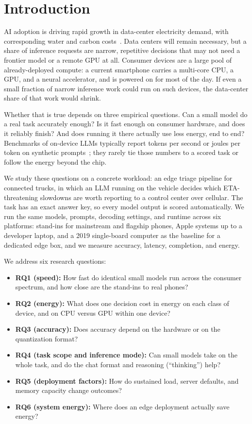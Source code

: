 \documentclass[conference]{IEEEtran}
\begin{document}
\section{Introduction}

AI adoption is driving rapid growth in data-center electricity demand, with corresponding water and carbon costs~\cite{iea2025energyai,luccioni2024power}. Data centers will remain necessary, but a share of inference requests are narrow, repetitive decisions that may not need a frontier model or a remote GPU at all. Consumer devices are a large pool of already-deployed compute: a current smartphone carries a multi-core CPU, a GPU, and a neural accelerator, and is powered on for most of the day. If even a small fraction of narrow inference work could run on such devices, the data-center share of that work would shrink.

Whether that is true depends on three empirical questions. Can a small model do a real task accurately enough? Is it fast enough on consumer hardware, and does it reliably finish? And does running it there actually use less energy, end to end? Benchmarks of on-device LLMs typically report tokens per second or joules per token on synthetic prompts~\cite{laskaridis2024melt}; they rarely tie those numbers to a scored task or follow the energy beyond the chip.

We study these questions on a concrete workload: an edge triage pipeline for connected trucks, in which an LLM running on the vehicle decides which ETA-threatening slowdowns are worth reporting to a control center over cellular. The task has an exact answer key, so every model output is scored automatically. We run the same models, prompts, decoding settings, and runtime across six platforms: stand-ins for mainstream and flagship phones, Apple systems up to a developer laptop, and a 2019 single-board computer as the baseline for a dedicated edge box, and we measure accuracy, latency, completion, and energy.

We address six research questions:
\begin{itemize}
\item \textbf{RQ1 (speed):} How fast do identical small models run across the consumer spectrum, and how close are the stand-ins to real phones?
\item \textbf{RQ2 (energy):} What does one decision cost in energy on each class of device, and on CPU versus GPU within one device?
\item \textbf{RQ3 (accuracy):} Does accuracy depend on the hardware or on the quantization format?
\item \textbf{RQ4 (task scope and inference mode):} Can small models take on the whole task, and do the chat format and reasoning (``thinking'') help?
\item \textbf{RQ5 (deployment factors):} How do sustained load, server defaults, and memory capacity change outcomes?
\item \textbf{RQ6 (system energy):} Where does an edge deployment actually save energy?
\end{itemize}
\end{document}
